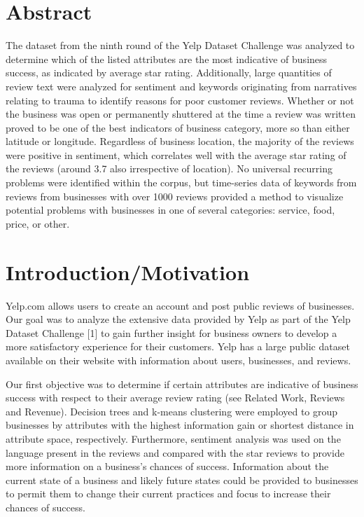 
\section{Abstract}

\quad The dataset from the ninth round of the Yelp Dataset Challenge was analyzed to determine which of the listed attributes are the most indicative of business success, as indicated by average star rating. Additionally, large quantities of review text were analyzed for sentiment and keywords originating from narratives relating to trauma to identify reasons for poor customer reviews. Whether or not the business was open or permanently shuttered at the time a review was written proved to be one of the best indicators of business category, more so than either latitude or longitude. Regardless of business location, the majority of the reviews were positive in sentiment, which correlates well with the average star rating of the reviews (around 3.7 also irrespective of location). No universal recurring problems were identified within the corpus, but time-series data of keywords from reviews from businesses with over 1000 reviews provided a method to visualize potential problems with businesses in one of several categories: service, food, price, or other.

\section{Introduction/Motivation}

\quad Yelp.com allows users to create an account and post public reviews of businesses. Our goal was to analyze the extensive data provided by Yelp as part of the Yelp Dataset Challenge [1] to gain further insight for business owners to develop a more satisfactory experience for their customers. Yelp has a large public dataset available on their website with information about users, businesses, and reviews.

\quad Our first objective was to determine if certain attributes are indicative of business success with respect to their average review rating (see Related Work, Reviews and Revenue). Decision trees and k-means clustering were employed to group businesses by attributes with the highest information gain or shortest distance in attribute space, respectively. Furthermore, sentiment analysis was used on the language present in the reviews and compared with the star reviews to provide more information on a business’s chances of success. Information about the current state of a business and likely future states could be provided to businesses to permit them to change their current practices and focus to increase their chances of success.

